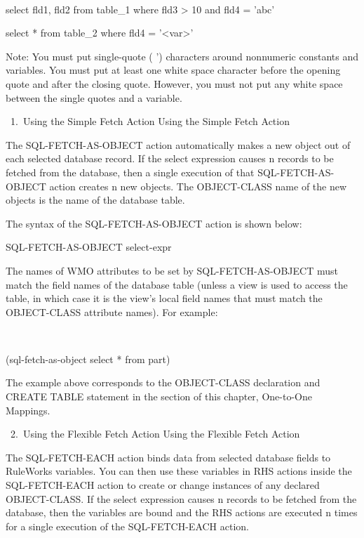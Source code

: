       

     select fld1, fld2 from table_1 where fld3 > 10
     and fld4 = 'abc'

     select * from table_2 where fld4 = '<var>'

     Note: You must put single-quote ( ')
     characters around nonnumeric constants and
     variables. You must put at least one white
     space character before the opening quote and
     after the closing quote. However, you must not
     put any white space between the single quotes
     and a variable.

       1. Using the Simple Fetch Action Using the
          Simple Fetch Action

          The SQL-FETCH-AS-OBJECT action
          automatically makes a new object out of
          each selected database record. If the
          select expression causes n records to be
          fetched from the database, then a single
          execution of that SQL-FETCH-AS-OBJECT
          action creates n new objects. The
          OBJECT-CLASS name of the new objects is
          the name of the database table.

          The syntax of the SQL-FETCH-AS-OBJECT
          action is shown below:

          SQL-FETCH-AS-OBJECT select-expr

          The names of WMO attributes to be set by
          SQL-FETCH-AS-OBJECT must match the field
          names of the database table (unless a
          view is used to access the table, in
          which case it is the view's local field
          names that must match the OBJECT-CLASS
          attribute names). For example:

           

          (sql-fetch-as-object select * from part)

          The example above corresponds to the
          OBJECT-CLASS declaration and CREATE TABLE
          statement in the section of this chapter,
          One-to-One Mappings.

       2. Using the Flexible Fetch Action Using the
          Flexible Fetch Action

          The SQL-FETCH-EACH action binds data from
          selected database fields to RuleWorks
          variables. You can then use these
          variables in RHS actions inside the
          SQL-FETCH-EACH action to create or change
          instances of any declared OBJECT-CLASS.
          If the select expression causes n records
          to be fetched from the database, then the
          variables are bound and the RHS actions
          are executed n times for a single
          execution of the SQL-FETCH-EACH action.

